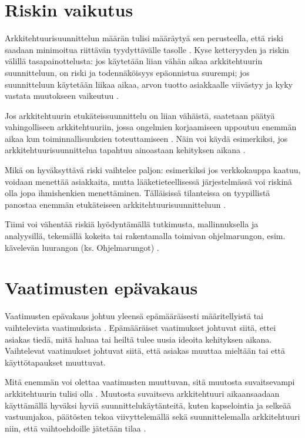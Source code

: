 \section{Riskin vaikutus}

Arkkitehtuurisuunnittelun määrän tulisi määräytyä sen perusteella, että riski saadaan minimoitua riittävän tyydyttävälle tasolle \citep{fairbanks2010just}. Kyse ketteryyden ja riskin välillä tasapainottelusta: jos käytetään liian vähän aikaa arkkitehtuurin suunnitteluun, on riski ja todennäköisyys epäonnistua suurempi; jos suunnitteluun käytetään liikaa aikaa, arvon tuotto asiakkaalle viivästyy ja kyky vastata muutokseen vaikeutuu \citep{waterman_how_2015}.

Jos arkkitehtuurin etukäteissuunnittelu on liian vähäistä, saatetaan päätyä vahingolliseen arkkitehtuuriin, jossa ongelmien korjaamiseen uppoutuu enemmän aikaa kun toiminnallisuuksien toteuttamiseen \citep{waterman_how_2015}. Näin voi käydä esimerkiksi, jos arkkitehtuurisuunnittelua tapahtuu ainoastaan kehityksen aikana \citep{eloranta2015techniques}.

Mikä on hyväksyttävä riski vaihtelee paljon: esimerkiksi jos verkkokauppa kaatuu, voidaan menettää asiakkaita, mutta lääketieteellisessä järjestelmässä voi riskinä olla jopa ihmishenkien menettäminen. Tälläisissä tilanteissa on tyypillistä panostaa enemmän etukäteiseen arkkitehtuurisuunnitteluun \citep{waterman_agility_2018_b}. 

Tiimi voi vähentää riskiä hyödyntämällä tutkimusta, mallinnuksella ja analyysillä, tekemällä kokeita tai rakentamalla toimivan ohjelmarungon, esim. kävelevän luurangon (ks. Ohjelmarungot) \citep{waterman_how_2015}. 

\section{Vaatimusten epävakaus}
Vaatimusten epävakaus johtuu yleensä epämääräisesti määritellyistä tai vaihtelevista vaatimuksista \citep{waterman_how_2015}. Epämääräiset vaatimukset johtuvat siitä, ettei asiakas tiedä, mitä haluaa tai heiltä tulee uusia ideoita kehityksen aikana. Vaihtelevat vaatimukset johtuvat siitä, että asiakas muuttaa mieltään tai että käyttötapaukset muuttuvat.

Mitä enemmän voi olettaa vaatimusten muuttuvan, sitä muutosta suvaitsevampi arkkitehtuurin tulisi olla \citep{waterman_how_2015}. Muutosta suvaitseva arkkitehtuuri aikaansaadaan käyttämällä hyväksi hyviä suunnittelukäytänteitä, kuten kapselointia ja selkeää vastuunjakoa, päätösten tekoa viivyttelemällä sekä suunnittelemalla arkkitehtuuri niin, että vaihtoehdoille jätetään tilaa \citep{waterman_agility_2018_a}. 


